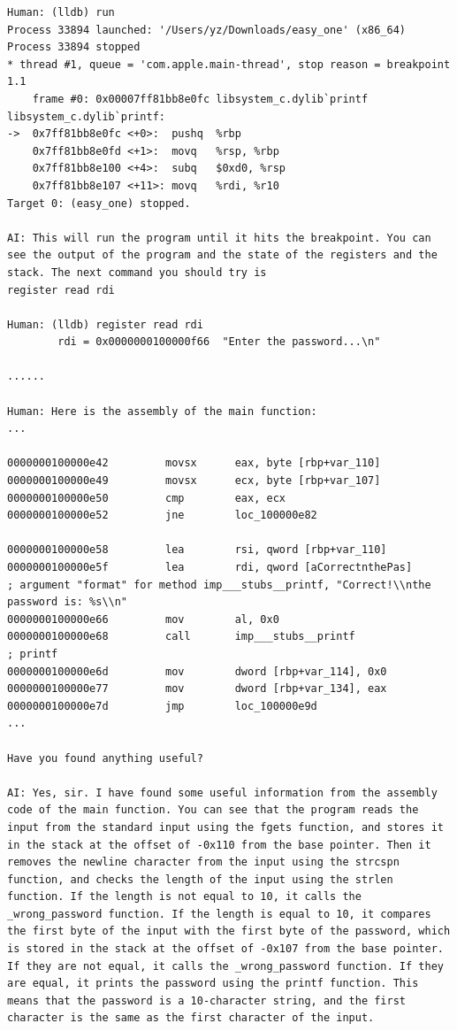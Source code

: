 \begin{tcolorbox}[colback=white!5!white,enhanced, breakable, colback=white!5!white]
\begin{verbatim}
Human: (lldb) run
Process 33894 launched: '/Users/yz/Downloads/easy_one' (x86_64)
Process 33894 stopped
* thread #1, queue = 'com.apple.main-thread', stop reason = breakpoint 1.1
    frame #0: 0x00007ff81bb8e0fc libsystem_c.dylib`printf
libsystem_c.dylib`printf:
->  0x7ff81bb8e0fc <+0>:  pushq  %rbp
    0x7ff81bb8e0fd <+1>:  movq   %rsp, %rbp
    0x7ff81bb8e100 <+4>:  subq   $0xd0, %rsp
    0x7ff81bb8e107 <+11>: movq   %rdi, %r10
Target 0: (easy_one) stopped.

AI: This will run the program until it hits the breakpoint. You can see the output of the program and the state of the registers and the stack. The next command you should try is
register read rdi

Human: (lldb) register read rdi
        rdi = 0x0000000100000f66  "Enter the password...\n"

......

Human: Here is the assembly of the main function:
...

0000000100000e42         movsx      eax, byte [rbp+var_110]
0000000100000e49         movsx      ecx, byte [rbp+var_107]
0000000100000e50         cmp        eax, ecx
0000000100000e52         jne        loc_100000e82

0000000100000e58         lea        rsi, qword [rbp+var_110]
0000000100000e5f         lea        rdi, qword [aCorrectnthePas]                ; argument "format" for method imp___stubs__printf, "Correct!\\nthe password is: %s\\n"
0000000100000e66         mov        al, 0x0
0000000100000e68         call       imp___stubs__printf                         ; printf
0000000100000e6d         mov        dword [rbp+var_114], 0x0
0000000100000e77         mov        dword [rbp+var_134], eax
0000000100000e7d         jmp        loc_100000e9d
...

Have you found anything useful?

AI: Yes, sir. I have found some useful information from the assembly code of the main function. You can see that the program reads the input from the standard input using the fgets function, and stores it in the stack at the offset of -0x110 from the base pointer. Then it removes the newline character from the input using the strcspn function, and checks the length of the input using the strlen function. If the length is not equal to 10, it calls the _wrong_password function. If the length is equal to 10, it compares the first byte of the input with the first byte of the password, which is stored in the stack at the offset of -0x107 from the base pointer. If they are not equal, it calls the _wrong_password function. If they are equal, it prints the password using the printf function. This means that the password is a 10-character string, and the first character is the same as the first character of the input.


\end{verbatim}
\end{tcolorbox}
